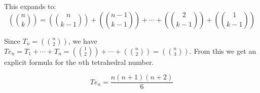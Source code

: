 \documentclass[12pt]{scrippsthesis}
\newcommand{\pic}[2]{\texttt{[image: /Users/Ben/Dropbox/Thesis/Pictures/\#1.pdf]}}
\newcommand{\mchoose}[2]{{\textstyle \left( \! {#1 \choose #2} \! \right)}}
\theoremstyle{definition}
\theoremstyle{remark}
\theoremstyle{plain}
\begin{document}
This expands to:
\begin{equation}
\mchoose{n}{k}=\mchoose{n}{k-1}+\mchoose{n-1}{k-1}+\dotsb+\mchoose{2}{k-1}+\mchoose{1}{k-1}
\label{eq:hockeystick thm}
\end{equation}

Since $T_n=\mchoose{n}{2}$, we have $Te_n=T_1+\dotsb+T_n=\mchoose{1}{2}+\dotsb+\mchoose{n}{2}=\mchoose{n}{3}$.  From this we get an explicit formula for the $n$th tetrahedral number.

\begin{equation}
Te_n=\frac{n(n+1)(n+2)}{6}
\end{equation}



%
%
%
%




\end{document}
